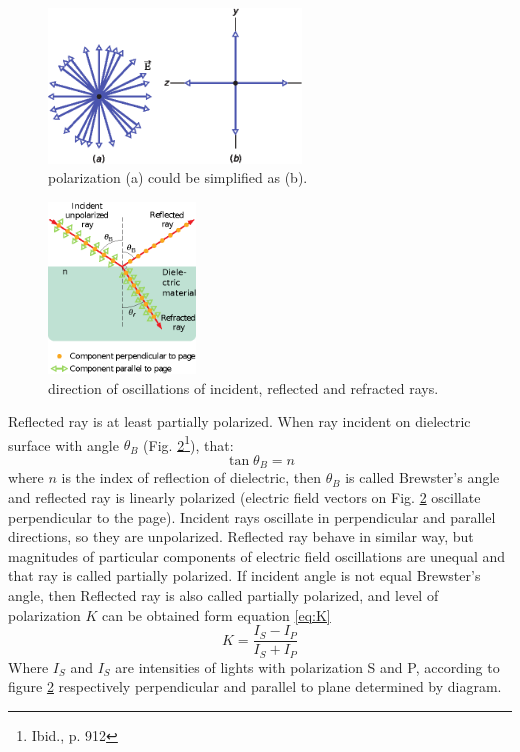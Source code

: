 \documentclass[a4paper,12pt]{article}
\begin{document}
\begin{figure}[ht]
    \begin{center}
        \includegraphics[width=0.60\textwidth]{simplified_polarization}
        \caption{polarization (a) could be simplified as (b).}
        \label{fig:sp}
    \end{center}
\end{figure}
\begin{figure}[ht]
\begin{center}
    \includegraphics[width=0.35\textwidth]{brewster}
    \caption{direction of oscillations of incident, reflected and refracted rays.}
    \label{fig:brewang}
\end{center}
\end{figure}
Reflected ray is at least partially polarized. When ray incident on dielectric surface with angle $\theta_B$ (Fig. \ref{fig:brewang}\footnote{Ibid., p. 912}), that:
\begin{equation}
    \tan \theta_B = n \label{eq:brew_ang}
\end{equation}
where $n$ is the index of reflection of dielectric, then $\theta_B$ is called Brewster's angle and reflected ray is linearly polarized (electric field vectors on Fig. \ref{fig:brewang} oscillate perpendicular to the page). Incident rays oscillate in perpendicular and parallel directions, so they are unpolarized. Reflected ray behave in similar way, but magnitudes of particular components of electric field oscillations are unequal and that ray is called partially polarized. If incident angle is not equal Brewster's angle, then Reflected ray is also called partially polarized, and level of polarization $K$ can be obtained form equation \ref{eq:K}
\begin{equation}
    K = \frac{I_S-I_P}{I_S+I_P} \label{eq:K}
\end{equation}
Where $I_S$ and $I_S$ are intensities of lights with polarization S and P, according to figure \ref{fig:brewang} respectively perpendicular and parallel to plane determined by diagram.
\end{document}
